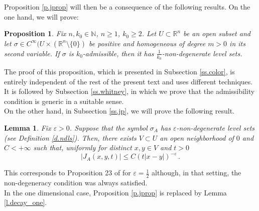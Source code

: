 \documentclass[10pt,twoside]{article}
\newcommand{\eps}{\varepsilon}
\newcommand{\R}{\mathbb{R}}
\newcommand{\N}{\mathbb{N}}
\numberwithin{theorem}{section}
\newtheorem{lemma}[theorem]{Lemma}
\newtheorem{proposition}[theorem]{Proposition}
\begin{document}
Proposition \ref{p.jprop} will then be a consequence of the following results. On the one hand, we will prove:
\begin{proposition}\label{p.color.1}
Fix $n,k_0\in\N$, $n\geq 1$, $k_0\geq 2$. Let $U\subset\R^n$ be an open subset and let $\sigma\in C^\infty(U\times(\R^n\setminus\{0\})$ be positive and homogeneous of degree $m>0$ in its second variable. If $\sigma$ is $k_0$-admissible, then it has $\frac{1}{k_0}$-non-degenerate level sets.
\end{proposition}
The proof of this proposition, which is presented in Subsection \ref{ss.color}, is entirely independent of the rest of the present text and uses different techniques. It is followed by Subsection \ref{ss.whitney}, in which we prove that the admissibility condition is generic in a suitable sense.\\

On the other hand, in Subsection \ref{ss.jp}, we will prove the following result.
\begin{lemma}\label{l.jati}
Fix $\eps>0$. Suppose that the symbol $\sigma_A$ has $\eps$-non-degenerate level sets (see Definition \ref{d.ndls}). Then, there exists $V\subset U$ an open neighborhood of $0$ and $C<+\infty$ such that, uniformly for distinct $x,y\in V$ and $t>0$
\[
|J_A(x,y,t)|\leq C\left(t|x-y|\right)^{-\eps}\, .
\]
\end{lemma}

This corresponds to Proposition 23 of \cite{ale161} for $\eps=\frac{1}{2}$ although, in that setting, the non-degeneracy condition was always satisfied.\\

In the one dimensional case, Proposition \ref{p.jprop} is replaced by Lemma \ref{l.decay_one}.\\
\end{document}
